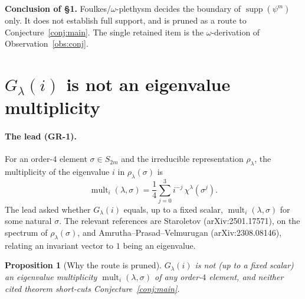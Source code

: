 \documentclass[11pt]{article}
\newtheorem{proposition}{Proposition}
\theoremstyle{definition}
\DeclareMathOperator{\supp}{supp}
\DeclareMathOperator{\mult}{mult}
\begin{document}
\noindent\textbf{Conclusion of \S1.} Foulkes/$\omega$-plethysm decides
the boundary of $\supp(\psi^m)$ only. It does not establish full support,
and is pruned as a route to Conjecture~\ref{conj:main}. The single
retained item is the $\omega$-derivation of
Observation~\ref{obs:conj}.

\section{$G_\lambda(i)$ is not an eigenvalue multiplicity}

\paragraph{The lead (GR-1).} For an order-$4$ element $\sigma\in S_{2m}$
and the irreducible representation $\rho_\lambda$, the multiplicity of the
eigenvalue $i$ in $\rho_\lambda(\sigma)$ is
\[
  \mult_i(\lambda,\sigma)=\frac14\sum_{j=0}^{3} i^{-j}\,
  \chi^\lambda(\sigma^j).
\]
The lead asked whether $G_\lambda(i)$ equals, up to a fixed scalar,
$\mult_i(\lambda,\sigma)$ for some natural $\sigma$. The relevant
references are Staroletov (arXiv:2501.17571), on the spectrum of
$\rho_\lambda(\sigma)$, and Amrutha--Prasad--Velmurugan
(arXiv:2308.08146), relating an invariant vector to $1$ being an
eigenvalue.

\begin{proposition}[Why the route is pruned]\label{prop:eig-pruned}
$G_\lambda(i)$ is not (up to a fixed scalar) an eigenvalue multiplicity
$\mult_i(\lambda,\sigma)$ of any order-$4$ element, and neither cited
theorem short-cuts Conjecture~\ref{conj:main}.
\end{proposition}
\end{document}
